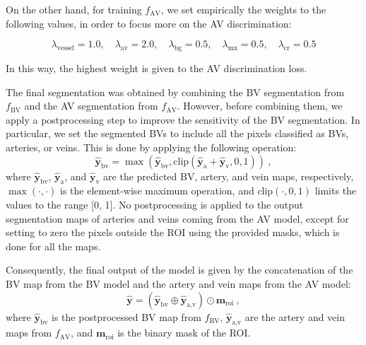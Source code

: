 \documentclass{article}
\begin{document}
On the other hand, for training $f_\text{AV}$, we set empirically the weights to the following values, in order to focus more on the \gls{AV} discrimination:

\begin{equation}
\lambda_{\text{vessel}} = 1.0, \quad
\lambda_{\text{av}} = 2.0, \quad
\lambda_{\text{bg}} = 0.5, \quad
\lambda_{\text{mx}} = 0.5, \quad
\lambda_{\text{cr}} = 0.5
\end{equation}

In this way, the highest weight is given to the \gls{AV} discrimination loss.

The final segmentation was obtained by combining the \gls{BV} segmentation from $f_\text{BV}$ and the \gls{AV} segmentation from $f_\text{AV}$.
However, before combining them, we apply a postprocessing step to improve the sensitivity of the \gls{BV} segmentation.
In particular, we set the segmented \glspl{BV} to include all the pixels classified as \glspl{BV}, arteries, or veins.
This is done by applying the following operation:
\begin{equation}
    \hat{\mathbf{y}}_\text{bv} = \max(\hat{\mathbf{y}}_\text{bv}, \text{clip}(\hat{\mathbf{y}}_\text{a} + \hat{\mathbf{y}}_\text{v}, 0, 1)) \ ,
\end{equation}
where $\hat{\mathbf{y}}_\text{bv}$, $\hat{\mathbf{y}}_\text{a}$, and $\hat{\mathbf{y}}_\text{v}$ are the predicted \gls{BV}, artery, and vein maps, respectively, $\max(\cdot, \cdot)$ is the element-wise maximum operation, and $\text{clip}(\cdot, 0, 1)$ limits the values to the range [0, 1].
No postprocessing is applied to the output segmentation maps of arteries and veins coming from the \gls{AV} model, except for setting to zero the pixels outside the \gls{ROI} using the provided masks, which is done for all the maps.

Consequently, the final output of the model is given by the concatenation of the \gls{BV} map from the \gls{BV} model and the artery and vein maps from the \gls{AV} model:
\begin{equation}
    \hat{\mathbf{y}} = \left(\hat{\mathbf{y}}_\text{bv} \oplus \hat{\mathbf{y}}_\text{a,v}\right) \odot \mathbf{m}_\text{roi} \ ,
\end{equation}
where $\hat{\mathbf{y}}_\text{bv}$ is the postprocessed \gls{BV} map from $f_\text{BV}$, $\hat{\mathbf{y}}_\text{a,v}$ are the artery and vein maps from $f_\text{AV}$, and $\mathbf{m}_\text{roi}$ is the binary mask of the \gls{ROI}.


\end{document}
